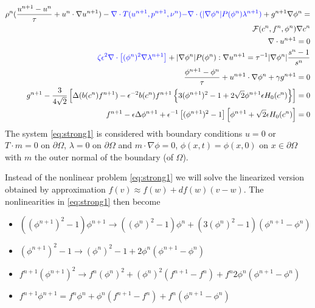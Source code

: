 \begin{equation}\label{eq:strong1}
\begin{aligned}
\rho^n(\frac{u^{n+1}-u^n}{\tau} + u^n\cdot \nabla u^{n+1}) - \textcolor{blue}{\nabla\cdot T(u^{n+1}, p^{n+1}, \nu^n)}
\textcolor{blue}{-\nabla\cdot(\semi{\nabla \phi^n}P(\phi^n)\lambda^{n+1})} +
g^{n+1}\nabla \phi^n =\\ \mathcal{F}(c^n, f^n, \phi^n)\nabla c^n\\
%
\nabla\cdot \Next{u} = 0\\
%
\textcolor{blue}{\zeta\epsilon^2\nabla\cdot\left[(\phi^n)^2\nabla\lambda^{n+1}\right]}
+\semi{\nabla \phi^n}P(\phi^n):\nabla u^{n+1} = \tau^{-1}\semi{\nabla \phi^n}\frac{s^n-1}{s^n}\\
%
\frac{\phi^{n+1}-\phi^n}{\tau} + u^{n+1}\cdot\nabla\phi^n + \gamma g^{n+1} = 0\\
%
g^{n+1}-\frac{3}{4\sqrt{2}}\left[
\Delta(b(c^n)f^{n+1}) - \epsilon^{-2}b(c^n)f^{n+1}\left\{
                      3(\phi^{n+1})^2 - 1 + 2\sqrt{2}\phi^{n+1}\epsilon H_0(c^n)
\right\}
\right]=0\\
%
f^{n+1} - \epsilon\Delta\phi^{n+1}+\epsilon^{-1}\left[
(\phi^{n+1})^2-1
\right]\left[
\phi^{n+1}+\sqrt{2}\epsilon H_0(c^n)
\right]=0\\
%
\end{aligned}
\end{equation}
%
The system \eqref{eq:strong1} is considered with boundary conditions
$u=0$ or $T\cdot m=0$ on $\partial\Omega$, $\lambda=0$ on $\partial \Omega$
and $m\cdot\nabla \phi=0$, $\phi(x, t)=\phi(x, 0)$ on $x\in\partial\Omega$
with $m$ the outer normal of the boundary (of $\Omega$).

Instead of the nonlinear problem \eqref{eq:strong1} we will solve the
linearized version obtained by approximation $f(v)\approx f(w) + df(w)(v-w)$.
The nonlinearities in \eqref{eq:strong1} then become
%
\begin{itemize}
\item $((\phi^{n+1})^2-1)\phi^{n+1}\to ((\phi^n)^2-1)\phi^n+(3(\phi^n)^2-1)(\phi^{n+1}-\phi^n)$
%
\item $(\phi^{n+1})^2-1\to (\phi^n)^2-1 + 2\phi^n(\phi^{n+1}-\phi^n)$
%
\item $f^{n+1}(\phi^{n+1})^2\to f^n(\phi^n)^2+(\phi^n)^2(f^{n+1}-f^n)+f^n2\phi^n(\phi^{n+1}-\phi^n)$
%
\item $f^{n+1}\phi^{n+1}=f^n\phi^n + \phi^n(f^{n+1}-f^{n}) + f^n(\phi^{n+1}-\phi^n)$
%
\end{itemize}
%

